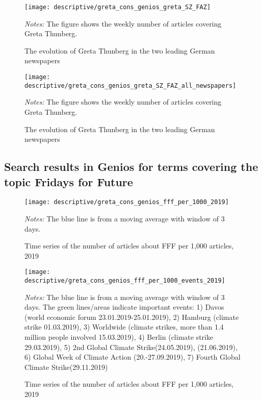 \documentclass[11pt, a4paper]{article} %
\begin{document}



\newpage
\begin{figure}[H]\centering
	\caption{The evolution of Greta Thunberg in the two leading German newspapers}
	\texttt{[image: descriptive/greta\_cons\_genios\_greta\_SZ\_FAZ]}
	\begin{minipage}{\linewidth}
		\scriptsize{\emph{Notes:} The figure shows the weekly number of articles covering Greta Thunberg.}
	\end{minipage}
\end{figure}
\begin{figure}[H]\centering
	\caption{The evolution of Greta Thunberg in the two leading German newspapers}
	\texttt{[image: descriptive/greta\_cons\_genios\_greta\_SZ\_FAZ\_all\_newspapers]}
	\begin{minipage}{\linewidth}
		\scriptsize{\emph{Notes:} The figure shows the weekly number of articles covering Greta Thunberg.}
	\end{minipage}
\end{figure}


\newpage
\subsection{Search results in Genios for terms covering the topic Fridays for Future}


\begin{figure}[H]\centering
	\caption{Time series of the number of articles about FFF per 1,000 articles, 2019}
	\texttt{[image: descriptive/greta\_cons\_genios\_fff\_per\_1000\_2019]}
	\begin{minipage}{\linewidth}
		\scriptsize{\emph{Notes:} The blue line is from a moving average with window of 3 days.}
	\end{minipage}
\end{figure}


\begin{figure}[H]\centering
	\caption{Time series of the number of articles about FFF per 1,000 articles, 2019}
	\texttt{[image: descriptive/greta\_cons\_genios\_fff\_per\_1000\_events\_2019]}
	\begin{minipage}{\linewidth}
		\scriptsize{\emph{Notes:} The blue line is from a moving average with window of 3 days. The green lines/areas indicate important events: 1) Davos (world economic forum 23.01.2019-25.01.2019), 2) Hamburg (climate strike 01.03.2019), 3) Worldwide (climate strikes, more than 1.4 million people involved 15.03.2019), 4) Berlin (climate strike 29.03.2019), 5) 2nd Global Climate Strike(24.05.2019), (21.06.2019), 6) Global Week of Climate Action (20.-27.09.2019), 7) Fourth Global Climate Strike(29.11.2019)}
	\end{minipage}
\end{figure}
\end{document}
